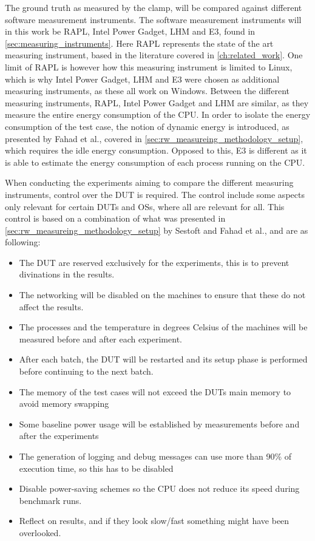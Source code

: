 The ground truth as measured by the clamp, will be compared against different software measurement instruments. The software measurement instruments will in this work be RAPL, Intel Power Gadget, LHM and E3, found in \cref{sec:measuring_instruments}. Here RAPL represents the state of the art measuring instrument, based in the literature covered in \cref{ch:related_work}. One limit of RAPL is however how this measuring instrument is limited to Linux, which is why Intel Power Gadget, LHM and E3 were chosen as additional measuring instruments, as these all work on Windows. Between the different measuring instruments, RAPL, Intel Power Gadget and LHM are similar, as they measure the entire energy consumption of the CPU. In order to isolate the energy consumption of the test case, the notion of dynamic energy is introduced, as presented by Fahad et al.\cite{fahad2019comparative}, covered in \cref{sec:rw_measureing_methodology_setup}, which requires the idle energy consumption. Opposed to this, E3 is different as it is able to estimate the energy consumption of each process running on the CPU.\newline

When conducting the experiments aiming to compare the different measuring instruments, control over the DUT is required. The control include some aspects only relevant for certain DUTs and OSs, where all are relevant for all. This control is based on a combination of what was presented in \cref{sec:rw_measureing_methodology_setup} by Sestoft\cite[]{sestoft2013microbenchmarks} and Fahad et al.\cite[]{fahad2019comparative}, and are as following:

\begin{itemize}
    \item The DUT are reserved exclusively for the experiments, this is to prevent divinations in the results.
    \item The networking will be disabled on the machines to ensure that these do not affect the results.
    \item The processes and the temperature in degrees Celsius of the machines will be measured before and after each experiment.
    \item After each batch, the DUT will be restarted and its setup phase is performed before continuing to the next batch.
    \item The memory of the test cases will not exceed the DUTs main memory to avoid memory swapping
    \item Some baseline power usage will be established by measurements before and after the experiments
    \item The generation of logging and debug messages can use more than 90\% of execution time, so this has to be disabled
    \item Disable power-saving schemes so the CPU does not reduce its speed during benchmark runs.
    \item Reflect on results, and if they look slow/fast something might have been overlooked.
\end{itemize}

